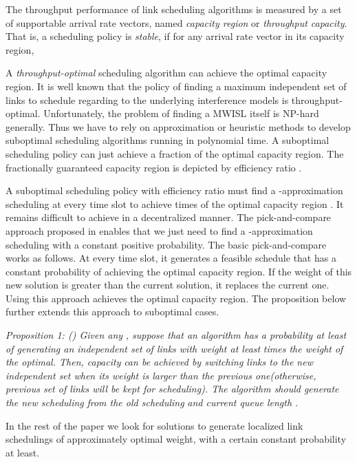 \documentclass[journal]{IEEEtran}
\begin{document}
 The throughput performance of link scheduling algorithms is measured by a set of supportable arrival rate vectors, named \emph{capacity region} or \emph{ throughput capacity}. That is, a scheduling policy is \emph{stable}, if for any arrival rate vector in its capacity region\cite{S:pick3},


A \textit{throughput-optimal} scheduling algorithm can achieve the optimal capacity region. It is well known that the policy of finding a maximum independent set of links to schedule regarding to the underlying interference models is throughput-optimal\cite{S:MWM1}. Unfortunately, the problem of finding a MWISL itself is NP-hard generally\cite{sharma2006complexity}. Thus we have to rely on approximation or heuristic methods to develop suboptimal scheduling algorithms running in polynomial time.
A suboptimal scheduling policy can just achieve a fraction of the optimal capacity region. The fractionally guaranteed capacity region is depicted by efficiency ratio  \cite{S:GMS}.

A suboptimal scheduling policy with efficiency ratio 
must find a -approximation scheduling at every time slot  to
achieve  times of the optimal capacity region \cite{lin2005info}. It remains difficult to achieve in a decentralized manner. The  pick-and-compare approach proposed in \cite{S:MWM2} enables that we just need to find a -approximation scheduling with a  constant positive probability. The basic pick-and-compare \cite{S:MWM2} works as follows. At every time slot, it generates a feasible schedule that has a constant probability of achieving the optimal capacity region. If the weight of this new solution is greater than the current solution, it replaces the current one. Using this approach achieves the optimal capacity region. The proposition below further extends this approach to suboptimal cases.

\textit{Proposition 1: (\cite{S:pick1}) Given any }\textit{, suppose that an algorithm has a probability at least }\textit{ of generating an independent set }\textit{ of links with weight at least }\textit{ times the weight of the optimal. Then, capacity }\textit{ can be achieved by switching links to the new independent set when its weight is larger than the previous one(otherwise, previous set of links will be kept for scheduling). The algorithm should generate the new scheduling}  \textit{ from the old scheduling }\textit{ and current queue length }\textit{.}

In the rest of the paper we look for solutions to generate localized link
schedulings of approximately optimal weight, with  a certain constant probability at least.
\end{document}
